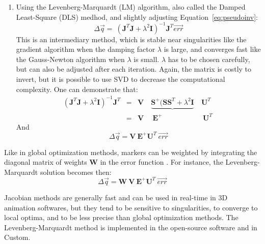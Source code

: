 \begin{enumerate}[itemsep=0em, topsep=0em, leftmargin=*]
    \item Using the Levenberg-Marquardt (LM) algorithm, also called the Damped Least-Square (DLS) medhod, and slightly adjusting Equation~\ref{eq:pseudoinv}:
    \begin{equation}
        \Delta \overrightarrow{q} = \ (\textbf{J}^T \textbf{J} + \lambda^2 \textbf{I})^{-1} \textbf{J}^T \overrightarrow{err}
    \end{equation} 
    This is an intermediary method, which is stable near singularities like the gradient algorithm when the damping factor $\lambda$ is large, and converges fast like the Gauss-Newton algorithm when  $\lambda$ is small. $\lambda$ has to be chosen carefully, but can also be adjusted after each iteration. Again, the matrix is costly to invert, but it is possible to use SVD to decrease the computational complexity. One can demonstrate that:
     \begin{equation}
        \begin{array}{rlccccc} 
            (\textbf{J}^T \textbf{J} + \lambda^2 \textbf{I})^{-1} \textbf{J}^T &=& \textbf{V} \ & \underbrace{\textbf{S}^{+} (\textbf{S} \textbf{S}^T+\lambda^2 \textbf{I}} \  & \textbf{U}^T \ \ \\
            & = & \textbf{V} & \ \textbf{E}^{+} & \  \textbf{U}^T
        \end{array}
     \end{equation}
    And 
      \begin{equation}
        \Delta \overrightarrow{q} =  \textbf{V} \ \textbf{E}^{+} \textbf{U}^T \ \overrightarrow{err} 
      \end{equation}
\end{enumerate}

Like in global optimization methods, markers can be weighted by integrating the diagonal matrix of weights \textbf{W} in the error function \cite{Meredith2005}. For instance, the Levenberg-Marquardt solution becomes then:
\begin{equation}
    \Delta \overrightarrow{q} =  \textbf{W} \ \textbf{V} \ \textbf{E}^{+} \textbf{U}^T \ \overrightarrow{err}
\end{equation}

Jacobian methods are generally fast and can be used in real-time in 3D animation softwares, but they tend to be sensitive to singularities, to converge to local optima, and to be less precise than global optimization methods. The Levenberg-Marquardt method is implemented in the open-source software \cite{Pinocchio,Carpentier2019} and in Custom. 


